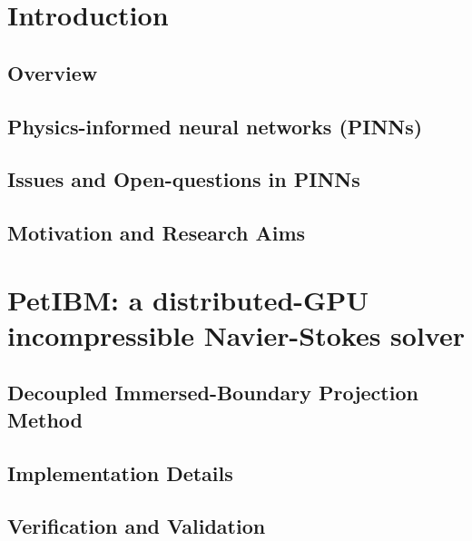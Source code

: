 \documentclass[font=STIX2]{gw-dissertation}[2021/11/19]
\begin{document}



\chapter{Introduction}

    \section{Overview}\label{sec:overview}
    

    \section{Physics-informed neural networks (PINNs)}\label{sec:pinn-review}
    

    \section{Issues and Open-questions in PINNs}\label{sec:pinn-issues}
    

    \section{Motivation and Research Aims}\label{sec:aims}
    

\chapter{PetIBM: a distributed-GPU incompressible Navier-Stokes solver}\label{chap:petibm}


    \section{Decoupled Immersed-Boundary Projection Method}\label{sec:petibm-math}
    

    \section{Implementation Details}\label{sec:petibm-impl}
    

    \section{Verification and Validation}\label{sec:petibm-vv}
    
\end{document}
